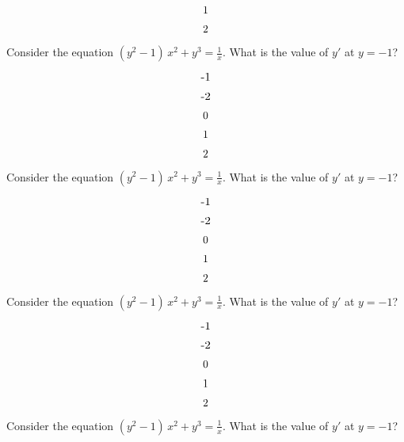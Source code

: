\documentclass[amsfonts,bezier,leqno,fleqn,12pt,a4paper]{article}
\def \v2{\vspace {3.5cm}}
\def \be{\begin{equation}}
\def \ee{\end{equation}}
\renewcommand{\sc}{\vspace {0.3in} \setcounter{equation}{0}}
\begin{document}
\begin{large}
			\be
			$1$
			\ee
		
			\be
			$2$
			\ee
		
\v2

\item %
Consider the equation $\displaystyle (y^2-1)\,x^2+y^3=\frac{1}{x}.$ What is the value of $y'$ at $y=-1$?
\sc

			\be
			$-1$
			\ee
		
			\be
			$-2$
			\ee
		
			\be
			$0$
			\ee
		
			\be
			$1$
			\ee
		
			\be
			$2$
			\ee
		
\newpage

\item %
Consider the equation $\displaystyle (y^2-1)\,x^2+y^3=\frac{1}{x}.$ What is the value of $y'$ at $y=-1$?
\sc

			\be
			$-1$
			\ee
		
			\be
			$-2$
			\ee
		
			\be
			$0$
			\ee
		
			\be
			$1$
			\ee
		
			\be
			$2$
			\ee
		
\v2

\item %
Consider the equation $\displaystyle (y^2-1)\,x^2+y^3=\frac{1}{x}.$ What is the value of $y'$ at $y=-1$?
\sc

			\be
			$-1$
			\ee
		
			\be
			$-2$
			\ee
		
			\be
			$0$
			\ee
		
			\be
			$1$
			\ee
		
			\be
			$2$
			\ee
		
\newpage

\item %
Consider the equation $\displaystyle (y^2-1)\,x^2+y^3=\frac{1}{x}.$ What is the value of $y'$ at $y=-1$?
\sc


\end{large}
\end{document}
